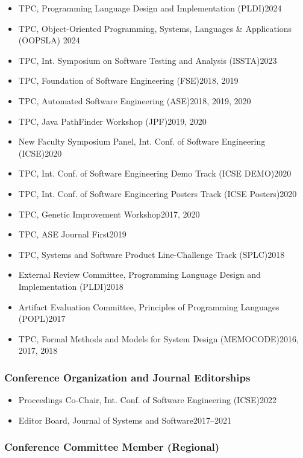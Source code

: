\documentclass[11pt]{article}
\begin{document}
\begin{itemize}
    \item TPC, Programming Language Design and Implementation (PLDI)\hfill 2024
    \item TPC, Object-Oriented Programming, Systems, Languages \& Applications (OOPSLA) \hfill 2024
    \item TPC,  Int. Symposium on Software Testing and Analysis (ISSTA)\hfill 2023
    \item TPC, Foundation of Software Engineering (FSE)\hfill 2018, 2019
    \item TPC, Automated Software Engineering (ASE)\hfill 2018, 2019, 2020
    \item TPC, Java PathFinder Workshop (JPF)\hfill 2019, 2020
    \item New Faculty Symposium Panel, Int. Conf. of Software Engineering (ICSE)\hfill 2020
    \item TPC, Int. Conf. of Software Engineering Demo Track (ICSE DEMO)\hfill 2020
    \item TPC, Int. Conf. of Software Engineering Posters Track (ICSE Posters)\hfill 2020
    \item TPC, Genetic Improvement Workshop\hfill 2017, 2020
    \item TPC, ASE Journal First\hfill 2019
    \item TPC, Systems and Software Product Line-Challenge Track (SPLC)\hfill 2018
    \item External Review Committee, Programming Language Design and Implementation (PLDI)\hfill 2018
    \item Artifact Evaluation Committee, Principles of Programming Languages (POPL)\hfill 2017
    \item TPC, Formal Methods and Models for System Design (MEMOCODE)\hfill 2016, 2017, 2018
\end{itemize}

\subsubsection{Conference Organization and Journal Editorships}
\begin{itemize}
    \item Proceedings Co-Chair,  Int. Conf. of Software Engineering (ICSE)\hfill 2022
    \item Editor Board, Journal of Systems and Software\hfill 2017--2021
\end{itemize}

\subsubsection{Conference Committee Member (Regional)}
\end{document}
